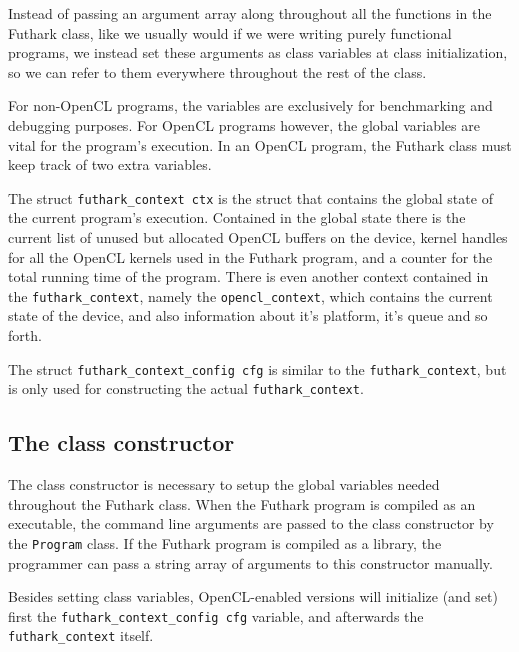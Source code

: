 Instead of passing an argument array along throughout all the functions in the
Futhark class, like we usually would if we were writing purely functional
programs, we instead set these arguments as class variables at class
initialization, so we can refer to them everywhere throughout the rest of the class.

For non-OpenCL programs, the variables are exclusively for benchmarking and
debugging purposes. For OpenCL programs however, the global variables are vital
for the program's execution.
In an OpenCL program, the Futhark class must keep track of two extra
variables.

The struct \texttt{futhark\_context ctx} is the struct that contains the global
state of the current program's execution. Contained in the global state there is
the current list of unused but allocated OpenCL buffers on the device, kernel
handles for all the OpenCL kernels used in the Futhark program, and a counter
for the total running time of the program.
There is even another context contained in the \texttt{futhark\_context}, namely
the \texttt{opencl\_context}, which contains the current state of the device,
and also information about it's platform, it's queue and so forth.

The struct \texttt{futhark\_context\_config cfg} is similar to the
\texttt{futhark\_context}, but is only used for constructing the actual
\texttt{futhark\_context}.

\subsection{The class constructor}
The class constructor is necessary to setup the global variables needed
throughout the Futhark class. When the Futhark program is compiled as an
executable, the command line arguments are passed to the class constructor by
the \texttt{Program} class. If the Futhark program is compiled as a library, the
programmer can pass a string array of arguments to this constructor manually.

Besides setting class variables, OpenCL-enabled versions will initialize (and
set) first the \texttt{futhark\_context\_config cfg} variable, and afterwards
the \texttt{futhark\_context} itself.

